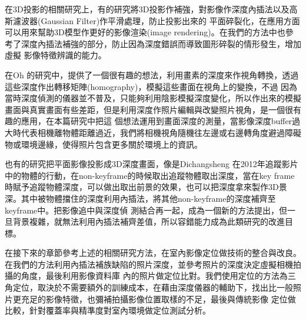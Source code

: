                                                                                                                                                                                                                                                                                                                                                                                                                                                                                                                                                                                                                                                                                                                                                                                                                                                                                                                                                                                                                                    
	在3D投影的相關研究上，有的研究將3D投影作補強\cite{Zhang2010}\cite{Riecher2012}，對影像作深度內插法以及高斯濾波器(Gaussian Filter)作平滑處理，防止投影出來的
平面碎裂化，在應用方面可以用來幫助3D模型作更好的影像渲染(image rendering)。在我們的方法中也參考了深度內插法補強的部分，防止因為深度錯誤而導致圖形碎裂的情形發生，增加虛擬
影像特徵辨識的能力。

	在Oh 的研究中\cite{Oh2001}，提供了一個很有趣的想法，利用畫素的深度來作視角轉換，透過這些深度作出轉移矩陣(homography)，模擬這些畫面在視角上的變換，不過
因為當時深度偵測的儀器並不普及，只能夠利用陰影模擬深度變化，所以作出來的模擬畫面與真實畫面有些差距，但是利用深度作照片編輯與改變照片視角，是一個很有趣的應用，在本篇研究中把這
個想法運用到畫面深度的測量，當影像深度buffer過大時代表相機離物體距離過近，我們將相機視角隨機往左邊或右邊轉角度避過障礙物或環境邊緣，使得照片包含更多關於環境上的資訊。
	
	也有的研究把平面影像投影成3D深度畫面，像是Dichangsheng 在2012年\cite{Dichangsheng2012}追蹤影片中的物體的行動，在non-keyframe的時候取出追蹤物體取出深度，當在key 
frame時賦予追蹤物體深度，可以做出取出前景的效果，也可以把深度拿來製作3D景深。其中被物體擋住的深度利用內插法，將其他non-keyframe的深度補齊至keyframe中。把影像追中與深度偵
測結合再一起，成為一個新的方法提出，但一旦背景複雜，就無法利用內插法補齊差值，所以容錯能力成為此類研究的改進目標。	

	在接下來的章節參考上述的相關研究方法，在室內影像定位做技術的整合與改良。在我們的方法利用內插法補族缺陷的照片深度，並參考照片的深度決定虛擬相機拍攝的角度，最後利用影像資料庫
內的照片做定位比對。我們使用定位的方法為三角定位，取決於不需要額外的訓練成本，在藉由深度儀器的輔助下，找出比一般照片更充足的影像特徵，也彌補拍攝影像位置取樣的不足，最後與傳統影像
定位做比較，針對覆蓋率與精準度對室內環境做定位測試分析。	


